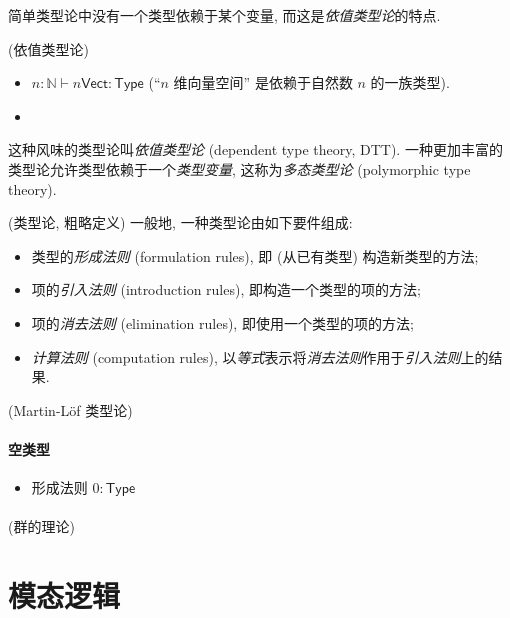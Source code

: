 简单类型论中没有一个类型依赖于某个变量, 而这是\emph{依值类型论}的特点.

\begin{example}
	{(依值类型论)}
	\begin{itemize}
		\item $n\colon \mathbb{N}\vdash n\mathsf {Vect}\colon \mathsf {Type}$ (``$n$ 维向量空间'' 是依赖于自然数 $n$ 的一族类型).
		\item 
	\end{itemize}
	这种风味的类型论叫\emph{依值类型论} (dependent type theory, DTT). 一种更加丰富的类型论允许类型依赖于一个\emph{类型变量}, 这称为\emph{多态类型论} (polymorphic type theory).
\end{example}

\begin{definition}
	{(类型论, 粗略定义)}
	一般地, 一种类型论由如下要件组成:
	\begin{itemize}
		\item 类型的\emph{形成法则} (formulation rules), 即 (从已有类型) 构造新类型的方法;
		\item 项的\emph{引入法则} (introduction rules), 即构造一个类型的项的方法;
		\item 项的\emph{消去法则} (elimination rules), 即使用一个类型的项的方法;
		\item \emph{计算法则} (computation rules), 以\emph{等式}表示将\emph{消去法则}作用于\emph{引入法则}上的结果.
	\end{itemize}
\end{definition}

\begin{example}
	{(Martin-L\"of 类型论)}
	\paragraph{空类型}
	\begin{itemize}
		\item 形成法则 $0\colon \mathsf {Type}$
	\end{itemize}
	
	\paragraph{}
\end{example}

\begin{example}
	{(群的理论)}
	
\end{example}

\section{模态逻辑}

